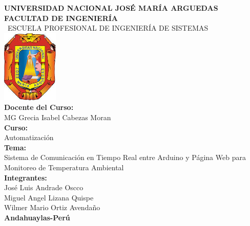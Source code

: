 
\begin{titlepage}
	\centering
	\vspace*{0cm}
	{\large\textbf{UNIVERSIDAD NACIONAL JOSÉ MARÍA ARGUEDAS}} \\
	\vspace*{0.5cm}
	{\large\textbf{FACULTAD DE INGENIERÍA}} \\
	\vspace*{0.5cm}
	{\large\ ESCUELA PROFESIONAL DE INGENIERÍA DE SISTEMAS } \\
	\vspace*{1.2cm}
	\includegraphics[width=0.2\textwidth]{unajma.png} \\
	\vspace{1cm}
	{\large \textbf{Docente del Curso:}}\\
	\vspace{0.2cm}	
	{\large MG Grecia Isabel Cabezas Moran}\\
	\vspace{0.2cm}
	{\large \textbf{Curso:}}\\
	\vspace{0.2cm}
	{\large Automatización}\\
	{\large \textbf{Tema:}}\\
	\vspace{0.2cm}
	{\large Sistema de Comunicación en Tiempo Real entre Arduino y Página Web para Monitoreo de Temperatura Ambiental}\\
	\vspace{1cm}
	{\large \textbf{Integrantes:}}\\
	\vspace{0.2cm}
	{\large José Luis Andrade Oscco}\\
	\vspace{0.2cm}
	{\large Miguel Angel Lizana Quispe}\\
	\vspace{0.2cm}
	{\large Wilmer Mario Ortiz Avendaño}\\
	\vspace{3cm}
	\textbf{{\large Andahuaylas-Perú}}	
\end{titlepage}
	
